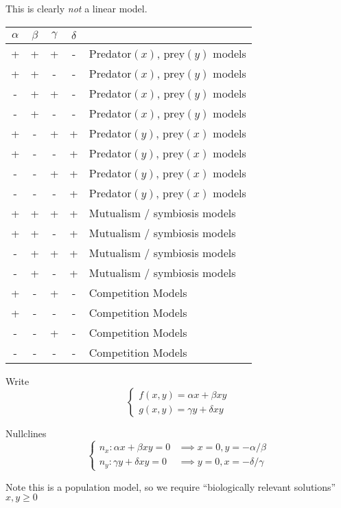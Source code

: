 \documentclass{/home/janmebows/Documents/LatexTemplates/myassignment}
\begin{document}
This is clearly \textit{not} a linear model.

\begin{table}
\centering
     \begin{tabular}{c|c|c|c|l}  
        $\alpha$ & $\beta$ & $\gamma$ & $\delta$ & \\
        \hline
        +&+&+&-&Predator$(x)$, prey$(y)$ models\\
        +&+&-&-&Predator$(x)$, prey$(y)$ models\\
        -&+&+&-&Predator$(x)$, prey$(y)$ models\\
        -&+&-&-&Predator$(x)$, prey$(y)$ models\\
        \hline
        +&-&+&+&Predator$(y)$, prey$(x)$ models\\
        +&-&-&+&Predator$(y)$, prey$(x)$ models\\
        -&-&+&+&Predator$(y)$, prey$(x)$ models\\
        -&-&-&+&Predator$(y)$, prey$(x)$ models\\
        \hline
        +&+&+&+&Mutualism / symbiosis models\\
        +&+&-&+&Mutualism / symbiosis models\\
        -&+&+&+&Mutualism / symbiosis models\\
        -&+&-&+&Mutualism / symbiosis models\\
        \hline
        +&-&+&-&Competition Models\\
        +&-&-&-&Competition Models\\
        -&-&+&-&Competition Models\\
        -&-&-&-&Competition Models\\
     \end{tabular}
\end{table} 



Write
\[\begin{cases}
    f(x,y) = \alpha x + \beta xy\\
    g(x,y) = \gamma y + \delta xy
\end{cases}\]

Nullclines
\[\begin{cases}
    n_x : \alpha x + \beta xy = 0 &\implies x =0, y = -\alpha/\beta\\
    n_y : \gamma y + \delta xy = 0 &\implies y =0, x = -\delta/\gamma
\end{cases}\]

Note this is a population model, so we require ``biologically relevant solutions'' $x,y \geq 0$
\end{document}
